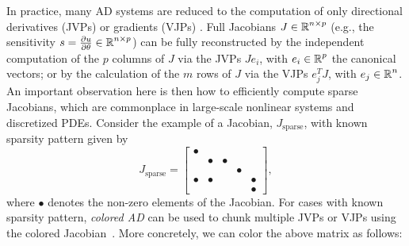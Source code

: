 In practice, many AD systems are reduced to the computation of only directional derivatives (JVPs) or gradients (VJPs) \cite{Griewank:2008kh}.
Full Jacobians $J \in \operatorname{\mathbb{R}}^{n \times p}$ (e.g., the sensitivity $s = \frac{\partial u}{\partial \theta} \in \operatorname{\mathbb{R}}^{n \times p}$) can be fully reconstructed by the independent computation of the $p$ columns of $J$ via the JVPs $J e_i$, with $e_i \in \operatorname{\mathbb{R}}^p$ the canonical vectors; or by the calculation of the $m$ rows of $J$ via the VJPs $e_j^T J$, with $e_j \in \operatorname{\mathbb{R}}^n$.
An important observation here is then how to efficiently compute sparse Jacobians, which are commonplace in large-scale nonlinear systems and discretized PDEs. 
Consider the example of a Jacobian, ${J}_{\text{sparse}}$, with known sparsity pattern given by
\begin{equation}
    {J}_{\text{sparse}} = \begin{bmatrix}
        \bullet &         &         &         &         \\
                & \bullet & \bullet &         &         \\
                &         &         & \bullet &         \\
        \bullet & \bullet &         &         & \bullet \\
                &         &         &         & \bullet
    \end{bmatrix},
\end{equation}
where $\bullet$ denotes the non-zero elements of the Jacobian. 
For cases with known sparsity pattern, \textit{colored AD} can be used to chunk multiple JVPs or VJPs using the colored Jacobian~\cite{gebremedhin2005color}. 
More concretely, we can color the above matrix as follows:
